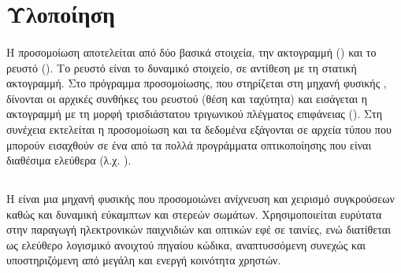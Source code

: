 \section{Υλοποίηση}

\paragraph{} Η προσομοίωση αποτελείται από δύο βασικά στοιχεία, την ακτογραμμή
() και το ρευστό (). Το ρευστό είναι το δυναμικό στοιχείο, σε
αντίθεση με τη στατική ακτογραμμή. Στο πρόγραμμα προσομοίωσης, που στηρίζεται στη μηχανή
φυσικής , δίνονται οι αρχικές συνθήκες του ρευστού (θέση και ταχύτητα) και
εισάγεται η ακτογραμμή με τη μορφή τρισδιάστατου τριγωνικού πλέγματος επιφάνειας
(). Στη συνέχεια εκτελείται η προσομοίωση και τα δεδομένα
εξάγονται σε αρχεία τύπου  που μπορούν εισαχθούν σε ένα από τα πολλά προγράμματα
οπτικοποίησης που είναι διαθέσιμα ελεύθερα (λ.χ. ).

\subsection{\texorpdfstring{}{}}
\label{ssec:bullet}
\paragraph{} Η  είναι μια μηχανή φυσικής που προσομοιώνει ανίχνευση και
χειρισμό συγκρούσεων καθώς και δυναμική εύκαμπτων και στερεών σωμάτων. Χρησιμοποιείται
ευρύτατα στην παραγωγή ηλεκτρονικών παιχνιδιών και οπτικών εφέ σε ταινίες, ενώ διατίθεται
ως ελεύθερο λογισμικό ανοιχτού πηγαίου κώδικα, αναπτυσσόμενη συνεχώς και υποστηριζόμενη
από μεγάλη και ενεργή κοινότητα χρηστών.

